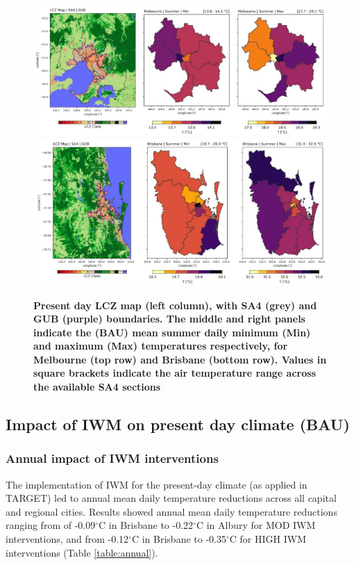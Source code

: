 \documentclass[utf8]{frontiersSCNS} %
\begin{document}
\begin{figure}
\centering
\includegraphics[trim={0 0 0 0},clip,scale=0.25]{images/image9.jpg}
\includegraphics[trim={0 0 0 0},clip,scale=0.25]{images/image8.jpg}
\caption{\bf Present day LCZ map (left column), with SA4 (grey) and GUB (purple) boundaries. The middle and right panels indicate the (BAU) mean summer daily minimum (Min) and maximum (Max) temperatures respectively, for Melbourne (top row) and Brisbane (bottom row). Values in square brackets indicate the air temperature range across the available SA4 sections}
 \label{fig:lczsa4}
\end{figure}

\subsection{Impact of IWM on present day climate (BAU)}\label{sec:results2}

\subsubsection{Annual impact of IWM interventions}\label{sec:results2a}

The implementation of IWM for the present-day climate (as applied in TARGET) led to annual mean daily temperature reductions across all capital and regional cities. Results showed annual mean daily temperature reductions ranging from of -0.09$^{\circ}$C in Brisbane to -0.22$^{\circ}$C in Albury for MOD IWM interventions, and from -0.12$^{\circ}$C in Brisbane to -0.35$^{\circ}$C for HIGH IWM interventions (Table \ref{table:annual}). 
\end{document}
